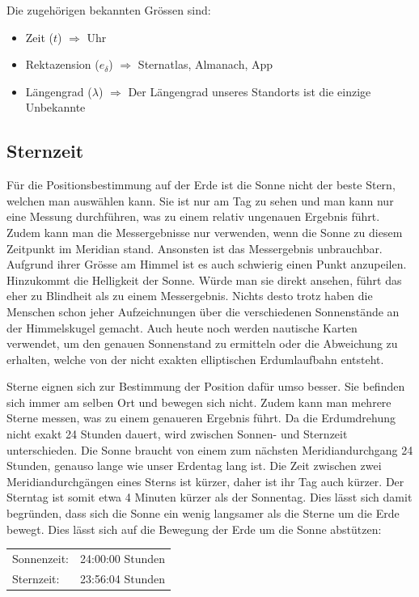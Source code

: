 \begin{refsection}
Die zugehörigen bekannten Grössen sind:
\begin{itemize}
\item Zeit ($t$) $\Rightarrow$ Uhr
\item Rektazension ($e_\delta$) $\Rightarrow$ Sternatlas, Almanach, App 
\item Längengrad ($\lambda$) $\Rightarrow$ Der Längengrad unseres Standorts ist die einzige Unbekannte
\end{itemize}


\subsection{Sternzeit}
Für die Positionsbestimmung auf der Erde ist die Sonne nicht der beste Stern, welchen man auswählen kann. Sie ist nur am Tag zu sehen und man kann nur eine Messung durchführen, was zu einem relativ ungenauen Ergebnis führt. Zudem kann man die Messergebnisse nur verwenden, wenn die Sonne zu diesem Zeitpunkt im Meridian stand. Ansonsten ist das Messergebnis unbrauchbar. Aufgrund ihrer Grösse am Himmel ist es auch schwierig einen Punkt anzupeilen. Hinzukommt die Helligkeit der Sonne. Würde man sie direkt ansehen, führt das eher zu Blindheit als zu einem Messergebnis.
Nichts desto trotz haben die Menschen schon jeher Aufzeichnungen über die verschiedenen Sonnenstände an der Himmelskugel gemacht. Auch heute noch werden nautische Karten verwendet, um den genauen Sonnenstand zu ermitteln oder die Abweichung zu erhalten, welche von der nicht exakten elliptischen Erdumlaufbahn entsteht.

Sterne eignen sich zur Bestimmung der Position dafür umso besser. Sie befinden sich immer am selben Ort und bewegen sich nicht. Zudem kann man mehrere Sterne messen, was zu einem genaueren Ergebnis führt. Da die Erdumdrehung nicht exakt 24 Stunden dauert, wird zwischen Sonnen- und Sternzeit unterschieden. Die Sonne braucht von einem zum nächsten Meridiandurchgang 24 Stunden, genauso lange wie unser Erdentag lang ist. Die Zeit zwischen zwei Meridiandurchgängen eines Sterns ist kürzer, daher ist ihr Tag auch kürzer. Der Sterntag ist somit etwa 4 Minuten kürzer als der Sonnentag. Dies lässt sich damit begründen, dass sich die Sonne ein wenig langsamer als die Sterne um die Erde bewegt. Dies lässt sich auf die Bewegung der Erde um die Sonne abstützen:
\begin{center}
\begin{tabular}{ll}
Sonnenzeit: & 24:00:00 Stunden \\
Sternzeit: & 23:56:04 Stunden
\end{tabular}
\end{center}


\end{refsection}

